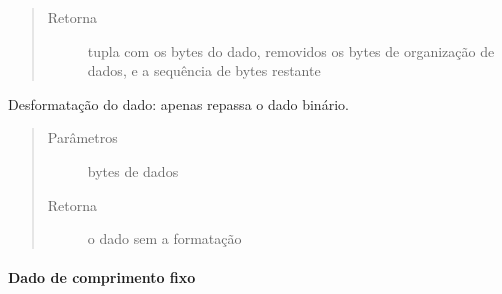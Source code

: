 \documentclass[letterpaper,10pt,brazil]{sphinxmanual}
\begin{document}
\begin{fulllineitems}
\begin{fulllineitems}
\begin{quote}
\begin{description}
\item[{Retorna}] \leavevmode
\sphinxAtStartPar
tupla com os bytes do dado, removidos os bytes de organização
de dados, e a sequência de bytes restante

\end{description}\end{quote}

\end{fulllineitems}


\begin{fulllineitems}
\label{\detokenize{estrutarq.dado:estrutarq.dado.DadoBinario.remova_formatacao}}
\pysigstartsignatures
{}
\pysigstopsignatures
\sphinxAtStartPar
Desformatação do dado: apenas repassa o dado binário.
\begin{quote}\begin{description}
\item[{Parâmetros}] \leavevmode
\sphinxAtStartPar
{} \textendash{} bytes de dados

\item[{Retorna}] \leavevmode
\sphinxAtStartPar
o dado sem a formatação

\end{description}\end{quote}

\end{fulllineitems}


\end{fulllineitems}



\paragraph{Dado de comprimento fixo}
\label{\detokenize{estrutarq.dado:dado-de-comprimento-fixo}}
\end{document}
